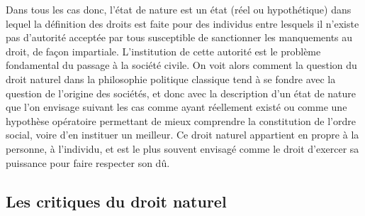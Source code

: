 Dans tous les cas donc, l’état de nature
est un état (réel ou hypothétique) dans
lequel la définition des droits est faite
pour des individus entre lesquels il
n'existe pas d’autorité acceptée par tous
susceptible de sanctionner les manquements au droit, de façon impartiale. L’institution de cette autorité est le problème
fondamental du passage à la société civile.
On voit alors comment la question du
droit naturel dans la philosophie politique
classique tend à se fondre avec la question
de l’origine des sociétés, et donc avec la
description d’un état de nature que l’on
envisage suivant les cas comme ayant
réellement existé ou comme une hypothèse opératoire permettant de mieux
comprendre la constitution de l’ordre
social, voire d’en instituer un meilleur. Ce
droit naturel appartient en propre à la
personne, à l’individu, et est le plus souvent envisagé comme le droit d’exercer sa
puissance pour faire respecter son dû.

\subsection{Les critiques du droit naturel}

